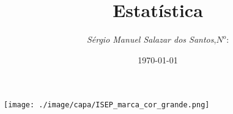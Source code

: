 \begin{titlepage}
\begin{minipage}{0.95\linewidth}
\centering
\texttt{[image: ./image/capa/ISEP\_marca\_cor\_grande.png]}
\label{Capa}
\title{Estatística}
\author{
\emph{S\'{e}rgio Manuel Salazar dos Santos},\;$N^o$: \\
}
\date{\today}
\maketitle
\end{minipage}
\end{titlepage}